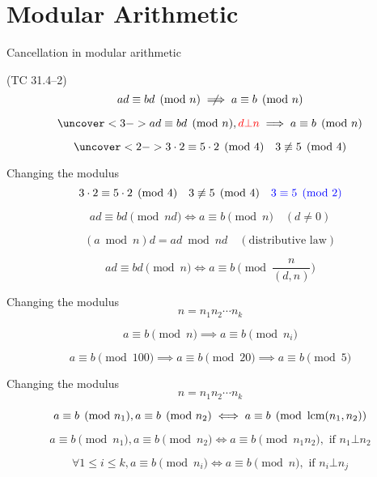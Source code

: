 \section{Modular Arithmetic}

\begin{frame}{Cancellation in modular arithmetic}
  \begin{exampleblock}{(TC 31.4--2)}
	\[
	  ad \equiv bd \pmod{n} \centernot\implies a \equiv b \pmod{n} 
	\]

	\[
	  \uncover<3->{ad \equiv bd \pmod{n}, \textcolor{red}{d \bot n} \implies a \equiv b \pmod{n}}
	\]
  \end{exampleblock}

  \[
	\uncover<2->{3 \cdot 2 \equiv 5 \cdot 2 \pmod{4} \quad 3 \not\equiv 5 \pmod{4}}
  \]
\end{frame}
\begin{frame}{Changing the modulus}
  \[
	3 \cdot 2 \equiv 5 \cdot 2 \pmod{4} \quad 3 \not\equiv 5 \pmod{4}
	\quad \textcolor{blue}{3 \equiv 5 \pmod{2}}
  \]

  \pause
  \[
	ad \equiv bd \pmod{nd} \iff a \equiv b \pmod{n} \quad (d \neq 0)
  \]

  \pause
  \[
	\boxed{(a \bmod n) d = ad \bmod nd \quad (\text{distributive law})}
  \]

  \pause
  \[
	ad \equiv bd \pmod{n} \iff a \equiv b \pmod{\frac{n}{(d,n)}}
  \]
\end{frame}
\begin{frame}{Changing the modulus}
  \[
	n = n_1n_2\cdots n_k
  \]

  \pause
  \[
	a \equiv b \pmod{n} \implies a \equiv b \pmod{n_i}
  \]

  \pause
  \[
	a \equiv b \pmod{100} \implies a \equiv b \pmod{20} \implies a \equiv b \pmod{5}
  \]
\end{frame}
\begin{frame}{Changing the modulus}
  \[
	n = n_1n_2\cdots n_k
  \]

  \pause
  \[
	a \equiv b \pmod{n_1}, a \equiv b \pmod{n_2} \iff a \equiv b \pmod{\operatorname{lcm}(n_1, n_2)}
  \]

  \pause
  \[
	a \equiv b \pmod{n_1}, a \equiv b \pmod{n_2} \iff a \equiv b \pmod{n_1n_2}, \text{ if } n_1 \bot n_2
  \]

  \pause
  \[
	\forall 1 \le i \le k, a \equiv b \pmod{n_i} \iff a \equiv b \pmod{n}, \text{ if } n_i \bot n_j
  \]
\end{frame}
